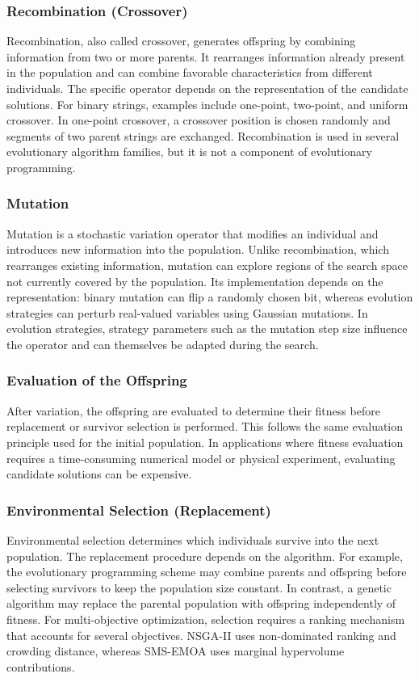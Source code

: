 \subsubsection{Recombination (Crossover)}
Recombination, also called crossover, generates offspring by combining
information from two or more parents. It rearranges information already
present in the population and can combine favorable characteristics from
different individuals. The specific operator depends on the representation
of the candidate solutions. For binary strings, examples include one-point,
two-point, and uniform crossover. In one-point crossover, a crossover
position is chosen randomly and segments of two parent strings are
exchanged. Recombination is used in several evolutionary algorithm
families, but it is not a component of evolutionary programming.
~\cite{Evolutionary_Algos}

\subsubsection{Mutation}
Mutation is a stochastic variation operator that modifies an individual
and introduces new information into the population. Unlike recombination,
which rearranges existing information, mutation can explore regions of
the search space not currently covered by the population. Its implementation
depends on the representation: binary mutation can flip a randomly chosen
bit, whereas evolution strategies can perturb real-valued variables using
Gaussian mutations. In evolution strategies, strategy parameters such as
the mutation step size influence the operator and can themselves be
adapted during the search.
~\cite{Evolutionary_Algos}

\subsubsection{Evaluation of the Offspring}
After variation, the offspring are evaluated to determine their fitness
before replacement or survivor selection is performed. This follows the
same evaluation principle used for the initial population. In applications
where fitness evaluation requires a time-consuming numerical model or
physical experiment, evaluating candidate solutions can be expensive.
~\cite{Evolutionary_Algos}

\subsubsection{Environmental Selection (Replacement)}
Environmental selection determines which individuals survive into the
next population. The replacement procedure depends on the algorithm.
For example, the evolutionary programming scheme may combine parents and offspring before selecting survivors to
keep the population size constant. In contrast, a genetic algorithm may
replace the parental population with offspring independently of fitness.
For multi-objective optimization, selection requires a ranking mechanism
that accounts for several objectives. NSGA-II uses non-dominated ranking
and crowding distance, whereas SMS-EMOA uses marginal hypervolume
contributions.
~\cite{Evolutionary_Algos}

